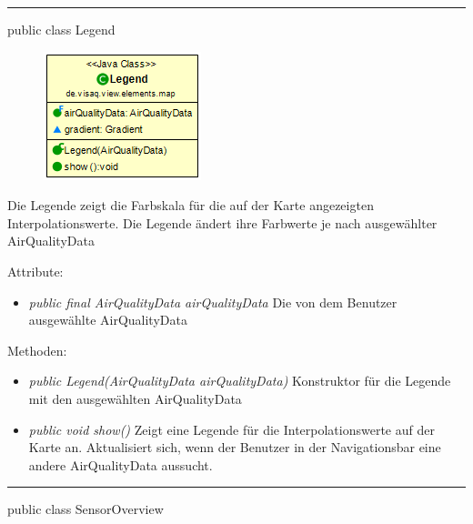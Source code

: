 \clearpage %

\rule{\textwidth}{0.4pt}
public class Legend

\begin{minipage}{0.3\textwidth}
    \begin{figure}[H]
        \includegraphics[scale = 0.6]{media/frontend/view/de.view.elements.map/Legend_Class.png}
    \end{figure}
    \end{minipage} \hfill
    \begin{minipage}{0.6\textwidth}
Die Legende zeigt die Farbskala für die auf der Karte angezeigten Interpolationswerte. Die Legende ändert ihre Farbwerte je nach ausgewählter AirQualityData
\end{minipage}

Attribute:
\begin{itemize}
    \item \emph{public final AirQualityData airQualityData} Die von dem Benutzer ausgewählte AirQualityData
\end{itemize}
Methoden:
\begin{itemize}
    \item \emph{public Legend(AirQualityData airQualityData)} Konstruktor für die Legende mit den ausgewählten AirQualityData
    \item \emph{public void show()} Zeigt eine Legende für die Interpolationswerte auf der Karte an. Aktualisiert sich, wenn der Benutzer in der Navigationsbar eine andere AirQualityData aussucht.
\end{itemize}
\clearpage %
\rule{\textwidth}{0.4pt}
public class SensorOverview

